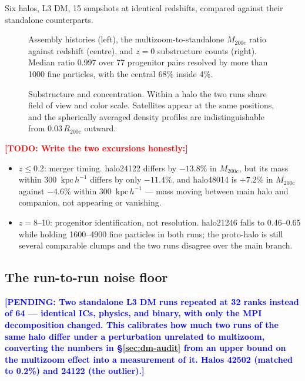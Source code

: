 \documentclass[twocolumn,linenumbers]{aastex631}
\newcommand{\todo}[1]{\textcolor{red}{\textbf{[TODO: #1]}}}
\newcommand{\pending}[1]{\textcolor{blue}{\textbf{[PENDING: #1]}}}
\newcommand{\measured}[1]{#1}
\newcommand{\Mvir}{\ensuremath{M_{200\mathrm{c}}}}
\newcommand{\Rvir}{\ensuremath{R_{200\mathrm{c}}}}
\newcommand{\kpch}{\ensuremath{\mathrm{kpc}\,h^{-1}}}
\begin{document}
Six halos, L3 DM, 15 snapshots at identical redshifts, compared against their
standalone counterparts.

\begin{figure}
\caption{Assembly histories (left), the multizoom-to-standalone \Mvir{} ratio
against redshift (centre), and $z=0$ substructure counts (right).
Median ratio \measured{0.997} over \measured{77} progenitor pairs resolved by
more than 1000 fine particles, with the central 68\% inside
\measured{4\%}.}
\label{fig:audit}
\end{figure}

\begin{figure}
\caption{Substructure and concentration. Within a halo the two runs share
field of view and color scale. Satellites appear at the same positions, and
the spherically averaged density profiles are indistinguishable from
$0.03\,\Rvir$ outward.}
\label{fig:projections}
\end{figure}

\todo{Write the two excursions honestly:}
\begin{itemize}
\item $z \le 0.2$: merger timing. halo24122 differs by
      \measured{$-13.8\%$} in \Mvir{}, but its mass within 300~\kpch{} differs
      by only \measured{$-11.4\%$}, and halo48014 is \measured{$+7.2\%$} in
      \Mvir{} against \measured{$-4.6\%$} within 300~\kpch{} --- mass moving
      between main halo and companion, not appearing or vanishing.
\item $z = 8$--10: progenitor identification, not resolution. halo21246 falls
      to \measured{0.46--0.65} while holding \measured{1600--4900} fine
      particles in both runs; the proto-halo is still several comparable
      clumps and the two runs disagree over the main branch.
\end{itemize}

\subsection{The run-to-run noise floor}
\label{sec:noise-floor}

\pending{Two standalone L3 DM runs repeated at 32 ranks instead of 64 ---
identical ICs, physics, and binary, with only the MPI decomposition changed.
This calibrates how much two runs of the same halo differ under a
perturbation unrelated to multizoom, converting the numbers in
\S\ref{sec:dm-audit} from an upper bound on the multizoom effect into a
measurement of it. Halos 42502 (matched to 0.2\%) and 24122 (the outlier).}
\end{document}
